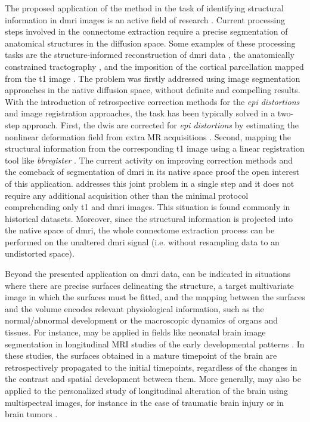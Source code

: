 The proposed application of the method in the task of identifying structural information
  in \gls*{dmri} images is an active field of research \citep{jeurissen_tissuetype_2015}.
Current processing steps involved in the connectome extraction require a precise segmentation
  of anatomical structures in the diffusion space.
Some examples of these processing tasks are the structure-informed reconstruction of \gls*{dmri}
  data \citep{jeurissen_multitissue_2014,daducci_accelerated_2015}, the anatomically constrained
  tractography \citep{smith_anatomicallyconstrained_2012}, and the imposition of the cortical
  parcellation mapped from the \gls*{t1} image \citep{hagmann_mapping_2008}.
The problem was firstly addressed using image segmentation approaches in the native diffusion
  space, without definite and compelling results.
With the introduction of retrospective correction methods for the \emph{\gls*{epi} distortions}
  and image registration approaches, the task has been typically solved in a two-step approach.
First, the \glspl*{dwi} are corrected for \emph{\gls*{epi} distortions} by estimating
  the nonlinear deformation field from extra MR acquisitions
  \citep{jezzard_correction_1995,chiou_simple_2000,cordes_geometric_2000,kybic_unwarping_2000}.
Second, mapping the structural information from the corresponding \gls*{t1} image
  using a linear registration tool like \emph{bbregister} \citep{greve_accurate_2009}.
The current activity on improving correction methods \citep{irfanoglu_drbuddi_2015} and
  the comeback of segmentation of \gls*{dmri} in its native space
  \citep{jeurissen_tissuetype_2015} proof the open interest of this application.
\Regseg{} addresses this joint problem in a single step and it does not require any additional
  acquisition other than the minimal protocol comprehending only \gls*{t1} and \gls*{dmri} images.
This situation is found commonly in historical datasets.
Moreover, since the structural information is projected into the native space of \gls*{dmri},
  the whole connectome extraction process can be performed on the unaltered \gls*{dmri}
  signal (i.e. without resampling data to an undistorted space).

Beyond the presented application on \gls*{dmri} data, \regseg{} can be indicated in situations
  where there are precise surfaces delineating the structure, a target multivariate
  image in which the surfaces must be fitted, and the mapping between the surfaces and
  the volume encodes relevant physiological information, such as the normal/abnormal
  development or the macroscopic dynamics of organs and tissues.
For instance, \regseg{} may be applied in fields like neonatal brain image segmentation
  in longitudinal MRI studies of the early developmental patterns \citep{shi_neonatal_2010}.
In these studies, the surfaces obtained in a mature timepoint of the brain are retrospectively
  propagated to the initial timepoints, regardless of the changes in the contrast and spatial
  development between them.
More generally, \regseg{} may also be applied to the personalized study of longitudinal alteration
  of the brain using multispectral images, for instance in the case of traumatic brain
  injury \citep{irimia_structural_2014} or in  brain tumors
  \citep{weizman_semiautomatic_2014}.